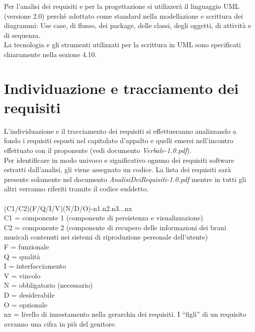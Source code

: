 Per l'analisi dei requisiti e per la progettazione si utilizzer\`a il linguaggio
UML (versione 2.0) perch\`e adottato come standard nella modellazione e
scrittura dei diagrammi: Use case, di flusso, dei package, delle classi, degli
oggetti, di attivit\`a e di sequenza. 
\\
La tecnologia e gli strumenti utilizzati per la scrittura in UML
sono specificati chiaramente nella sezione 4.10.

\section{Individuazione e tracciamento dei requisiti}
L'individuazione e il tracciamento dei requisiti si effettueranno analizzando a
fondo i requisiti esposti nel capitolato d'appalto e quelli emersi nell'incontro effettuato con il proponente (vedi documento \emph{Verbale-1.0.pdf}).
\\
Per identificare in modo univoco e significativo ognuno dei requisiti software
estratti dall'analisi, gli viene assegnato un codice.
La lista dei requisiti sar\`a presente solamente nel documento
\emph{AnalisiDeiRequisiti-1.0.pdf} mentre in tutti gli altri verranno riferiti tramite il codice suddetto.
\\
\\
(C1/C2)(F/Q/I/V)(N/D/O)-n1.n2.n3...nx\\
C1 = componente 1 (componente di persistenza e visualizzazione)\\
C2 = componente 2 (componente di recupero delle informazioni dei brani
musicali contenuti nei sistemi di riproduzione personale dell'utente)\\
F = funzionale\\
Q = qualit\`a\\
I = interfacciamento\\
V = vincolo\\
N = obbligatorio (necessario)\\
D = desiderabile\\
O = opzionale\\
nx = livello di innestamento nella gerarchia dei requisiti. I ``figli'' di un
requisito avranno una cifra in pi\`u del genitore.


